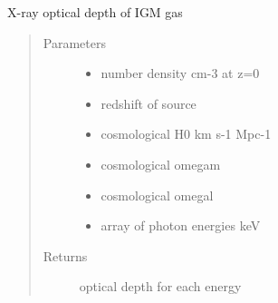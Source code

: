 \documentclass[letterpaper,10pt,english]{sphinxmanual}
\begin{document}

\begin{fulllineitems}
\label{\detokenize{astro_functions:astro.igmtau}}
X-ray optical depth of IGM gas
\begin{quote}\begin{description}
\item[{Parameters}] \leavevmode\begin{itemize}
\item {} 
 \textendash{} number density cm-3 at z=0

\item {} 
 \textendash{} redshift of source

\item {} 
 \textendash{} cosmological H0 km s-1 Mpc-1

\item {} 
 \textendash{} cosmological omegam

\item {} 
 \textendash{} cosmological omegal

\item {} 
 \textendash{} array of photon energies keV

\end{itemize}

\item[{Returns}] \leavevmode
optical depth for each energy

\end{description}\end{quote}

\end{fulllineitems}

\end{document}

